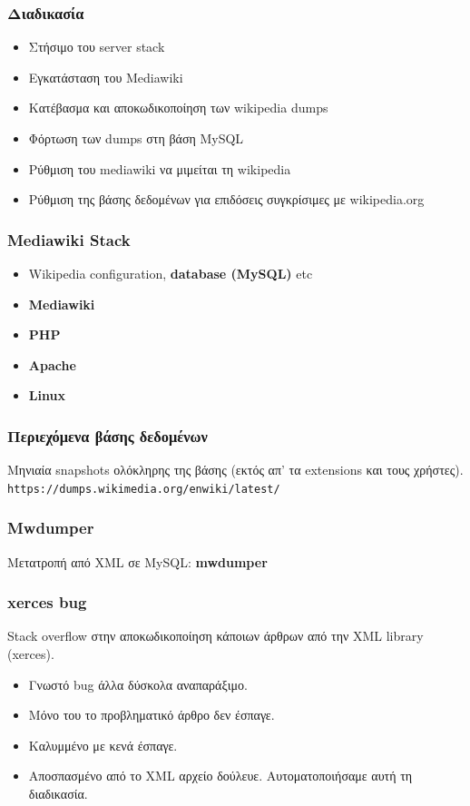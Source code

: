 \documentclass[bigger]{beamer}
\begin{document}
\begin{frame}
  \frametitle{Διαδικασία}
  \begin{itemize}
  \item<2-> Στήσιμο του server stack
  \item<3-> Εγκατάσταση του Mediawiki
  \item<4-> Κατέβασμα και αποκωδικοποίηση των wikipedia dumps
  \item<5-> Φόρτωση των dumps στη βάση MySQL
  \item<6-> Ρύθμιση του mediawiki να μιμείται τη wikipedia
  \item<7-> {\color{gray}Ρύθμιση της βάσης δεδομένων για επιδόσεις
      συγκρίσιμες με wikipedia.org}
  \end{itemize}
\end{frame}

\begin{frame}
  \frametitle{Mediawiki Stack}

  \begin{itemize}
  \item Wikipedia configuration, \textbf<2>{database (MySQL)} etc
  \item \textbf<2>{Mediawiki}
  \item \textbf<2>{PHP}
  \item \textbf<2>{Apache}
  \item \textbf<2>{Linux}
  \end{itemize}
  \vfill
  \vfill
\end{frame}

\begin{frame}
  \frametitle{Περιεχόμενα βάσης δεδομένων}

  Μηνιαία snapshots ολόκληρης της βάσης (εκτός απ' τα extensions και
  τους χρήστες).
  \vfill
  \texttt{https://dumps.wikimedia.org/enwiki/latest/} \vfill
\end{frame}

\begin{frame}
  \frametitle{Mwdumper}

  Μετατροπή από XML σε MySQL: \bf{mwdumper}
\end{frame}

\begin{frame}
  \frametitle{xerces bug} Stack overflow στην αποκωδικοποίηση κάποιων
  άρθρων από την XML library (xerces).
  \vfill
  \begin{itemize}
  \item<2-> Γνωστό bug άλλα δύσκολα αναπαράξιμο.
  \item<3-> Μόνο του το προβληματικό άρθρο δεν έσπαγε.
  \item<4-> Καλυμμένο με κενά έσπαγε.
  \item<5-> Αποσπασμένο από το XML αρχείο δούλευε. 
    Αυτοματοποιήσαμε αυτή τη διαδικασία.
  \end{itemize}
\end{frame}
\end{document}

